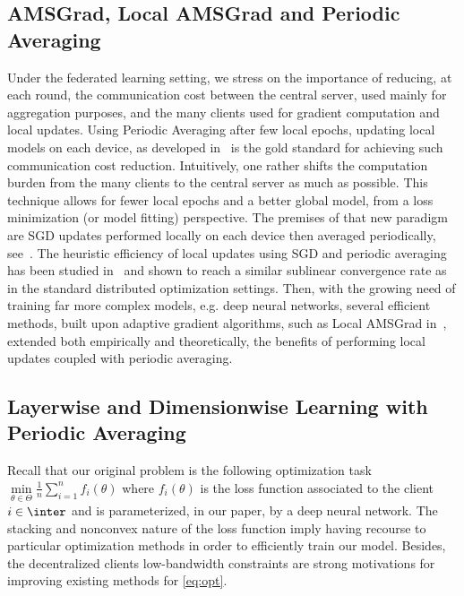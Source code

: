 \documentclass[11pt]{article}
\begin{document}
\subsection{AMSGrad, Local AMSGrad and Periodic Averaging}
Under the federated learning setting, we stress on the importance of reducing, at each round, the communication cost between the central server, used mainly for aggregation purposes, and the many clients used for gradient computation and local updates.
Using Periodic Averaging after few local epochs, updating local models on each device, as developed in~\citep{mcmahan2017communication} is the gold standard for achieving such communication cost reduction.
Intuitively, one rather shifts the computation burden from the many clients to the central server as much as possible. 
This technique allows for fewer local epochs and a better global model, from a loss minimization (or model fitting) perspective.
The premises of that new paradigm are SGD updates performed locally on each device then averaged periodically, see~\citep{konevcny2016federated, zhou2017convergence}.
The heuristic efficiency of local updates using SGD and periodic averaging has been studied in~\citep{stich2018local,yu2019linear} and shown to reach a similar sublinear convergence rate as in the standard distributed optimization settings.
Then, with the growing need of training far more complex models, e.g. deep neural networks, several efficient methods, built upon adaptive gradient algorithms, such as Local AMSGrad in~\citep{chen2020toward}, extended both empirically and theoretically, the benefits of performing local updates coupled with periodic averaging.



\subsection{Layerwise and Dimensionwise Learning with Periodic Averaging}

Recall that our original problem is the following optimization task $\min \limits_{\theta \in \Theta} \frac{1}{n} \sum_{i=1}^n f_i(\theta)$ where $f_i(\theta)$ is the loss function associated to the client $i \in \inter$ and is parameterized, in our paper, by a deep neural network.
The stacking and nonconvex nature of the loss function imply having recourse to particular optimization methods in order to efficiently train our model.
Besides, the decentralized clients low-bandwidth constraints are strong motivations for improving existing methods for \eqref{eq:opt}.  
\end{document}
